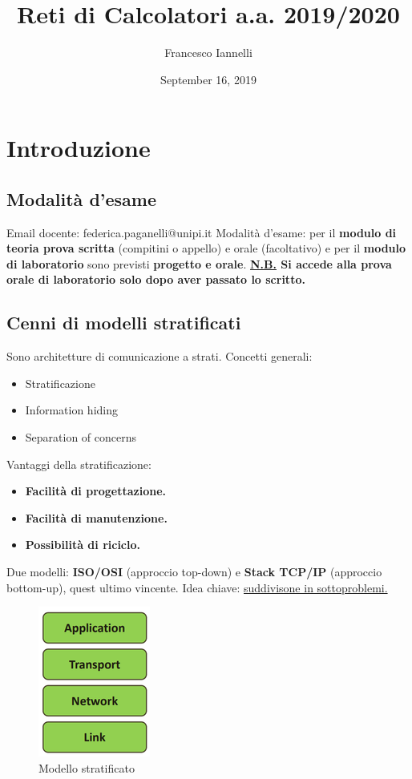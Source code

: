 \documentclass[11pt,a4paper,oneside]{book}
\theoremstyle{definition}
\begin{document}
\title{Reti di Calcolatori a.a. 2019/2020}
\author{Francesco Iannelli}
\date{September 16, 2019}
\maketitle

\setcounter{tocdepth}{5}
\tableofcontents

\pagebreak

\chapter{Introduzione}
\section{Modalità d'esame}
Email docente: federica.paganelli@unipi.it\newline
Modalità d'esame: per il \textbf{modulo di teoria prova scritta} (compitini o appello) e orale (facoltativo) e per il \textbf{modulo di laboratorio} sono previsti \textbf{progetto e orale}. \newline
\textbf{\underline{N.B.} Si accede alla prova orale di laboratorio solo dopo aver passato lo scritto.}

\section{Cenni di modelli stratificati}
Sono architetture di comunicazione a strati. \newline
Concetti generali:
\begin{itemize}
	\item Stratificazione
	\item Information hiding
	\item Separation of concerns
\end{itemize}
Vantaggi della stratificazione:
\begin{itemize}
	\item \textbf{Facilità di progettazione.}
	\item \textbf{Facilità di manutenzione.}
	\item \textbf{Possibilità di riciclo.}
\end{itemize}
Due modelli: \textbf{ISO/OSI} (approccio top-down) e \textbf{Stack TCP/IP} (approccio bottom-up), quest ultimo vincente.\newline
Idea chiave: \underline{suddivisone in sottoproblemi.}
\begin{figure}[!h]
	\includegraphics[scale=0.8]{Immagini/Modelli_Strat.png}
	\centering
	\caption{Modello stratificato}
\end{figure}
\end{document}
